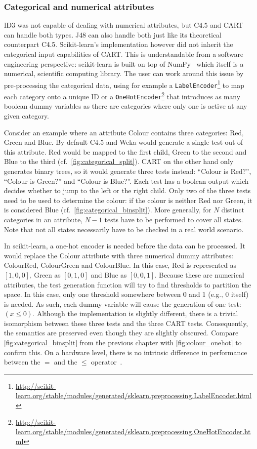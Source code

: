 \subsubsection{Categorical and numerical attributes}%
\label{sssec:cat_num_attr}
ID3 was not capable of dealing with numerical attributes, but C4.5 and CART can handle both types. J48 can also handle both just like its theoretical counterpart C4.5. Scikit-learn's implementation however did not inherit the categorical input capabilities of CART. This is understandable from a software engineering perspective: scikit-learn is built on top of NumPy~\cite{numpy} which itself is a numerical, scientific computing library. The user can work around this issue by pre-processing the categorical data, using for example a \texttt{LabelEncoder}\footnote{\url{http://scikit-learn.org/stable/modules/generated/sklearn.preprocessing.LabelEncoder.html}} to map each category onto a unique ID or a \texttt{OneHotEncoder}\footnote{\url{http://scikit-learn.org/stable/modules/generated/sklearn.preprocessing.OneHotEncoder.html}} that introduces as many boolean dummy variables as there are categories where only one is active at any given category.

Consider an example where an attribute Colour contains three categories: Red, Green and Blue. By default C4.5 and Weka would generate a single test out of this attribute. Red would be mapped to the first child, Green to the second and Blue to the third (cf.~\autoref{fig:categorical_split}). CART on the other hand only generates binary trees, so it would generate three tests instead: ``Colour is Red?'', ``Colour is Green?'' and ``Colour is Blue?''. Each test has a boolean output which decides whether to jump to the left or the right child. Only two of the three tests need to be used to determine the colour: if the colour is neither Red nor Green, it is considered Blue (cf.~\autoref{fig:categorical_binsplit}). More generally, for $N$ distinct categories in an attribute, $N-1$ tests have to be performed to cover all states. Note that not all states necessarily have to be checked in a real world scenario.

In scikit-learn, a one-hot encoder is needed before the data can be processed. It would replace the Colour attribute with three numerical dummy attributes: ColourRed, ColourGreen and ColourBlue. In this case, Red is represented as $[1, 0, 0]$, Green as $[0, 1, 0]$ and Blue as $[0, 0, 1]$. Because these are numerical attributes, the test generation function will try to find thresholds to partition the space. In this case, only one threshold somewhere between 0 and 1 (e.g., 0 itself) is needed. As such, each dummy variable will cause the generation of one test: $(x \leqslant 0)$. Although the implementation is slightly different, there is a trivial isomorphism between these three tests and the three CART tests. Consequently, the semantics are preserved even though they are slightly obscured. Compare \autoref{fig:categorical_binsplit} from the previous chapter with \autoref{fig:colour_onehot} to confirm this. On a hardware level, there is no intrinsic difference in performance between the $=$ and the $\leqslant$ operator~\cite{microarchitecture}.

